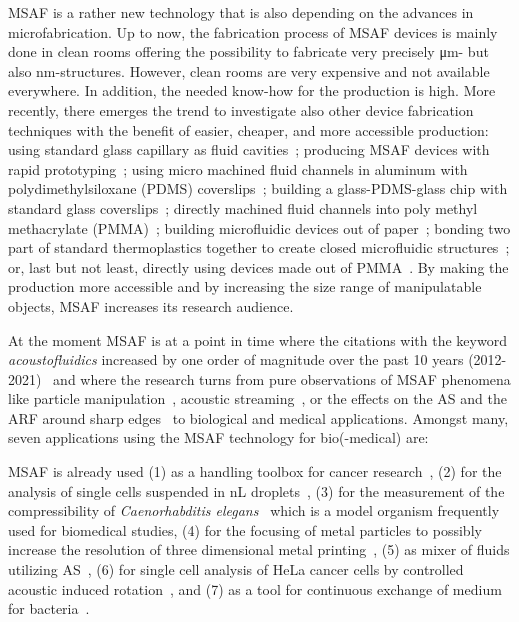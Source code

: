MSAF is a rather new technology that is also depending on the advances in 
microfabrication. Up to now, the fabrication process of MSAF devices is mainly 
done in clean rooms offering the possibility to fabricate very precisely 
\si{\um}- but also \si{\nm}-structures. However, clean rooms are very expensive 
and not available everywhere. In addition, the needed know-how for the 
production is high. More recently, there emerges the trend to investigate also 
other device fabrication techniques with the benefit of easier, cheaper, and 
more accessible production: using standard glass capillary as fluid 
cavities~\cite{Wiklund2001,Hammarstrom2010,Hammarstrom2012,Mishra2014,Gralinski2014,Gerlt2022}; 
producing MSAF devices with rapid prototyping~\cite{Adams2012}; using micro 
machined fluid channels in aluminum with polydimethylsiloxane (PDMS) 
coverslips~\cite{Gautam2018}; building a glass-PDMS-glass chip with standard 
glass coverslips~\cite{Xu2019}; directly machined fluid channels into poly 
methyl methacrylate (PMMA)~\cite{Harris2012}; building microfluidic devices out 
of paper~\cite{Martinez2010}; bonding two part of standard thermoplastics 
together to create closed microfluidic structures~\cite{Mueller2013}; or, last 
but not least, directly using devices made out of 
PMMA~\cite{Gonzalez2015,Yang2017}. By making the production more accessible and 
by increasing the size range of manipulatable objects, MSAF increases its 
research audience.

At the moment MSAF is at a point in time where the citations with the keyword 
\emph{acoustofluidics} increased by one order of magnitude over the past 10 
years (2012-2021)~\cite{Novotny2021} and where the research turns from pure 
observations of MSAF phenomena like particle 
manipulation~\cite{Wiklund2012a,Laurell2007,Collins2016,Gedge2012,Ding2012b,Cetin2016b,Aubert2016,Novotny2021}, 
acoustic streaming~\cite{Hoyos2013,Castro2016,Lei2016}, or the effects on the 
AS and the ARF around sharp 
edges~\cite{Leibacher2015,Chen2021,Doinikov2020,Doinikov2020b} to biological 
and medical applications. Amongst many, seven applications using the MSAF 
technology for bio(-medical) are:

MSAF is already used (1) as a handling toolbox for cancer 
research~\cite{Antfolk2015,Wu2021,Wang2020,Nguyen2021}, (2) for the analysis of 
single cells suspended in \si{\nano\liter} droplets~\cite{Gerlt2020a}, (3) for 
the measurement of the compressibility of \emph{Caenorhabditis 
elegans}~\cite{Baasch2018} which is a model organism frequently used for 
biomedical studies, (4) for the focusing of metal particles to possibly 
increase the resolution of three dimensional metal printing~\cite{Gerlt2022}, 
(5) as mixer of fluids utilizing 
AS~\cite{Patel2014,Ozcelik2014,Bachman2020,Zhang2021}, (6) for single cell 
analysis of HeLa cancer cells by controlled acoustic induced 
rotation~\cite{Laeubli2021}, and (7) as a tool for continuous exchange of 
medium for bacteria~\cite{Gerlt2021}.

